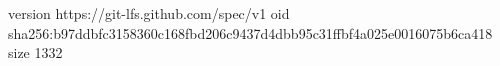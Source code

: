 version https://git-lfs.github.com/spec/v1
oid sha256:b97ddbfc3158360c168fbd206c9437d4dbb95c31ffbf4a025e0016075b6ca418
size 1332
